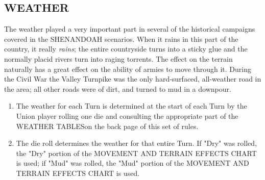 \subsection{WEATHER}

The weather played a very important part in several of the historical campaigns covered in the SHENANDOAH scenarios. When it rains in this part of the country, it really \textit{rains}; the entire countryside turns into a sticky glue and the normally placid rivers turn into raging torrents. The effect on the terrain naturally has a great effect on the ability of armies to move through it. During the Civil War the Valley Turnpike was the only hard-surfaced, all-weather road in the area; all other roads were of dirt, and turned to mud in a downpour.

\begin{enumerate}
  \item The weather for each Turn is determined at the start of each Turn by the Union player rolling one die and consulting the appropriate part of the WEATHER TABLESon the back page of this set of rules.
  \item The die roll determines the weather for that entire Turn. If "Dry" was rolled, the "Dry" portion of the MOVEMENT AND TERRAIN EFFECTS CHART is used; if "Mud" was rolled, the "Mud" portion of the MOVEMENT AND TERRAIN EFFECTS CHART is used.
\end{enumerate}
